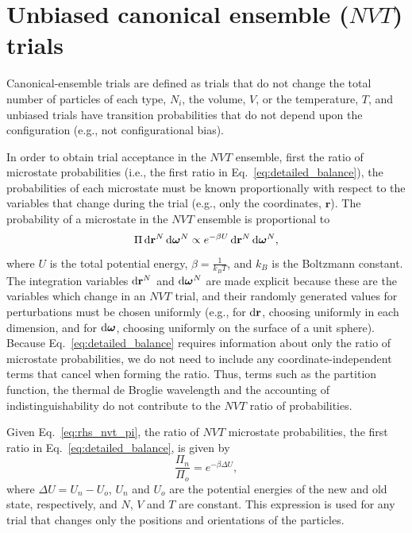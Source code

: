 \section{\label{sec:rhs_nvt}Unbiased canonical ensemble ($NVT$) trials}

Canonical-ensemble trials are defined as trials that do not change the total number of particles of each type, $N_i$, the volume, $V$, or the temperature, $T$, and unbiased trials have transition probabilities that do not depend upon the configuration (e.g., not configurational bias).

In order to obtain trial acceptance in the $NVT$ ensemble, first the ratio of microstate probabilities (i.e., the first ratio in Eq.~\ref{eq:detailed_balance}), the probabilities of each microstate must be known proportionally with respect to the variables that change during the trial (e.g., only the coordinates, $\mathbf{r}$).
The probability of a microstate in the $NVT$ ensemble is proportional to \cite{allen_computer_1989, frenkel_understanding_2002}
\begin{equation}
\Pi \mathop{}\!\mathrm{d}\mathbf{r}^N\mathop{}\!\mathrm{d}\boldsymbol{\omega}^N \propto e^{-\beta U} \mathop{}\!\mathrm{d}\mathbf{r}^N\mathop{}\!\mathrm{d}\boldsymbol{\omega}^N,
\label{eq:rhs_nvt_pi}
\end{equation}
where $U$ is the total potential energy, $\beta=\frac{1}{k_B T}$, and $k_B$ is the Boltzmann constant.
The integration variables $\mathop{}\!\mathrm{d}\mathbf{r}^{N}$ and $\mathop{}\!\mathrm{d}\boldsymbol{\omega}^{N}$ are made explicit because these are the variables which change in an $NVT$ trial, and their randomly generated values for perturbations must be chosen uniformly (e.g., for $\mathop{}\!\mathrm{d}\mathbf{r}$, choosing uniformly in each dimension, and for $\mathop{}\!\mathrm{d}\boldsymbol{\omega}$, choosing uniformly on the surface of a unit sphere).
Because Eq.~\ref{eq:detailed_balance} requires information about only the ratio of microstate probabilities, we do not need to include any coordinate-independent terms that cancel when forming the ratio.
Thus, terms such as the partition function, the thermal de Broglie wavelength and the accounting of indistinguishability do not contribute to the $NVT$ ratio of probabilities.

Given Eq.~\ref{eq:rhs_nvt_pi}, the ratio of $NVT$ microstate probabilities, the first ratio in Eq.~\ref{eq:detailed_balance}, is given by
\begin{equation}
\frac{\Pi_n}{\Pi_o} = e^{-\beta\Delta U},
\label{eq:rhs_nvt}
\end{equation}
where $\Delta U = U_n - U_o$, $U_n$ and $U_o$ are the potential energies of the new and old state, respectively, and $N$, $V$ and $T$ are constant.
This expression is used for any trial that changes only the positions and orientations of the particles.

